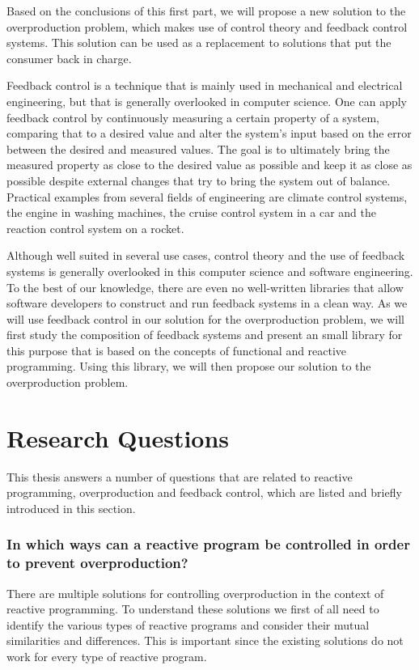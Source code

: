 Based on the conclusions of this first part, we will propose a new solution to the overproduction problem, which makes use of control theory and feedback control systems. This solution can be used as a replacement to solutions that put the consumer back in charge.

Feedback control is a technique that is mainly used in mechanical and electrical engineering, but that is generally overlooked in computer science. One can apply feedback control by continuously measuring a certain property of a system, comparing that to a desired value and alter the system's input based on the error between the desired and measured values. The goal is to ultimately bring the measured property as close to the desired value as possible and keep it as close as possible despite external changes that try to bring the system out of balance.  Practical examples from several fields of engineering are climate control systems, the engine in washing machines, the cruise control system in a car and the reaction control system on a rocket.

Although well suited in several use cases, control theory and the use of feedback systems is generally overlooked in this computer science and software engineering. To the best of our knowledge, there are even no well-written libraries that allow software developers to construct and run feedback systems in a clean way. As we will use feedback control in our solution for the overproduction problem, we will first study the composition of feedback systems and present an small library for this purpose that is based on the concepts of functional and reactive programming. Using this library, we will then propose our solution to the overproduction problem.

\section*{Research Questions}
This thesis answers a number of questions that are related to reactive programming, overproduction and feedback control, which are listed and briefly introduced in this section.

\subsubsection*{In which ways can a reactive program be controlled in order to prevent overproduction?}
There are multiple solutions for controlling overproduction in the context of reactive programming. To understand these solutions we first of all need to identify the various types of reactive programs and consider their mutual similarities and differences. This is important since the existing solutions do not work for every type of reactive program.

